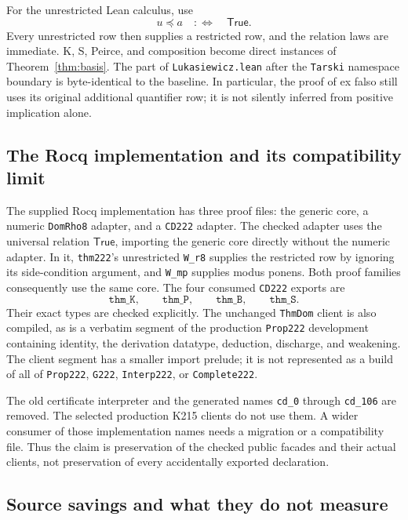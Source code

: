 \documentclass[11pt]{article}
\newcommand{\Below}{\mathrel{\preccurlyeq}}
\begin{document}
For the unrestricted Lean calculus, use
\[
  u\Below a\quad:\Longleftrightarrow\quad\mathsf{True}.
\]
Every unrestricted row then supplies a restricted row, and the relation laws are immediate. K, S, Peirce, and composition become direct instances of Theorem~\ref{thm:basis}. The part of \texttt{Lukasiewicz.lean} after the \texttt{Tarski} namespace boundary is byte-identical to the baseline. In particular, the proof of ex falso still uses its original additional quantifier row; it is not silently inferred from positive implication alone.

\subsection{The Rocq implementation and its compatibility limit}

The supplied Rocq implementation has three proof files: the generic core, a numeric \texttt{DomRho8} adapter, and a \texttt{CD222} adapter. The checked adapter uses the universal relation $\mathsf{True}$, importing the generic core directly without the numeric adapter. In it, \texttt{thm222}'s unrestricted \texttt{W\_r8} supplies the restricted row by ignoring its side-condition argument, and \texttt{W\_mp} supplies modus ponens. Both proof families consequently use the same core. The four consumed \texttt{CD222} exports are
\[
\texttt{thm\_K},\qquad\texttt{thm\_P},\qquad\texttt{thm\_B},\qquad\texttt{thm\_S}.
\]
Their exact types are checked explicitly. The unchanged \texttt{ThmDom} client is also compiled, as is a verbatim segment of the production \texttt{Prop222} development containing identity, the derivation datatype, deduction, discharge, and weakening. The client segment has a smaller import prelude; it is not represented as a build of all of \texttt{Prop222}, \texttt{G222}, \texttt{Interp222}, or \texttt{Complete222}.

The old certificate interpreter and the generated names \texttt{cd\_0} through \texttt{cd\_106} are removed. The selected production K215 clients do not use them. A wider consumer of those implementation names needs a migration or a compatibility file. Thus the claim is preservation of the checked public facades and their actual clients, not preservation of every accidentally exported declaration.

\subsection{Source savings and what they do not measure}
\end{document}
